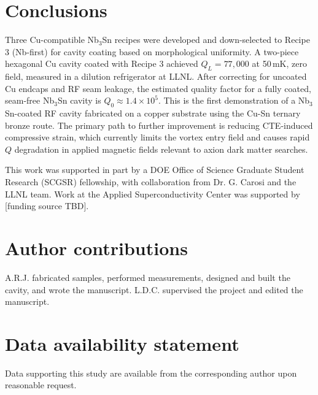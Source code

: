 \documentclass{iopjournal}
\begin{document}
\section{Conclusions}

Three Cu-compatible Nb$_3$Sn recipes were developed and down-selected to Recipe 3 (Nb-first) for cavity coating based on morphological uniformity. A two-piece hexagonal Cu cavity coated with Recipe 3 achieved $Q_L = 77{,}000$ at 50\,mK, zero field, measured in a dilution refrigerator at LLNL. After correcting for uncoated Cu endcaps and RF seam leakage, the estimated quality factor for a fully coated, seam-free Nb$_3$Sn cavity is $Q_0 \approx 1.4 \times 10^5$. This is the first demonstration of a Nb$_3$Sn-coated RF cavity fabricated on a copper substrate using the Cu-Sn ternary bronze route. The primary path to further improvement is reducing CTE-induced compressive strain, which currently limits the vortex entry field and causes rapid $Q$ degradation in applied magnetic fields relevant to axion dark matter searches.

\ack
This work was supported in part by a DOE Office of Science Graduate Student Research (SCGSR) fellowship, with collaboration from Dr. G. Carosi and the LLNL team. Work at the Applied Superconductivity Center was supported by [funding source TBD].

\section*{Author contributions}
A.R.J. fabricated samples, performed measurements, designed and built the cavity, and wrote the manuscript. L.D.C. supervised the project and edited the manuscript.

\section*{Data availability statement}
Data supporting this study are available from the corresponding author upon reasonable request.

\printbibliography
\end{document}
